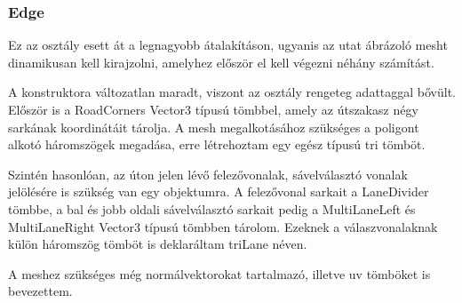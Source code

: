 \subsubsection{Edge}
Ez az osztály esett át a legnagyobb átalakításon, ugyanis az utat ábrázoló mesht dinamikusan kell kirajzolni, amelyhez először el kell végezni néhány számítást.

A konstruktora változatlan maradt, viszont az osztály rengeteg adattaggal bővült. Először is a RoadCorners Vector3 típusú tömbbel, amely az útszakasz négy sarkának koordinátáit tárolja. A mesh megalkotásához szükséges a poligont alkotó háromszögek megadása, erre létrehoztam egy egész típusú tri tömböt.

Szintén hasonlóan, az úton jelen lévő felezővonalak, sávelválasztó vonalak jelölésére is szükség van egy objektumra. A felezővonal sarkait a LaneDivider tömbbe, a bal és jobb oldali sávelválasztó sarkait pedig a MultiLaneLeft és MultiLaneRight Vector3 típusú tömbben tárolom. Ezeknek a válaszvonalaknak külön háromszög tömböt is deklaráltam triLane néven.

A meshez szükséges még normálvektorokat tartalmazó, illetve uv tömböket is bevezettem.


